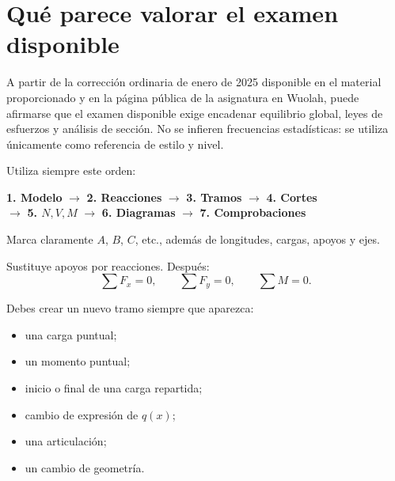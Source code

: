 \chapter*{Qué parece valorar el examen disponible}
A partir de la corrección ordinaria de enero de 2025 disponible en el material proporcionado y en la página pública de la asignatura en Wuolah, puede afirmarse que el examen disponible exige encadenar equilibrio global, leyes de esfuerzos y análisis de sección. No se infieren frecuencias estadísticas: se utiliza únicamente como referencia de estilo y nivel.\autocite{wuolah-examen-2025,wuolah-ule-page}



Utiliza siempre este orden:

\begin{tcolorbox}[
  colback=grisclaro,
  colframe=gris,
  boxrule=0.6pt,
  arc=1.5mm,
  left=6pt,right=6pt,top=6pt,bottom=6pt
]
\centering
\small
\textbf{1. Modelo} $\rightarrow$ \textbf{2. Reacciones} $\rightarrow$ \textbf{3. Tramos} $\rightarrow$ \textbf{4. Cortes}\\[1.5mm]
$\rightarrow$ \textbf{5. $N,V,M$} $\rightarrow$ \textbf{6. Diagramas} $\rightarrow$ \textbf{7. Comprobaciones}
\end{tcolorbox}

Marca claramente $A$, $B$, $C$, etc., además de longitudes, cargas, apoyos y ejes.

Sustituye apoyos por reacciones. Después:
\[
\sum F_x=0,\qquad\sum F_y=0,\qquad\sum M=0.
\]

Debes crear un nuevo tramo siempre que aparezca:
\begin{itemize}
  \item una carga puntual;
  \item un momento puntual;
  \item inicio o final de una carga repartida;
  \item cambio de expresión de $q(x)$;
  \item una articulación;
  \item un cambio de geometría.
\end{itemize}


